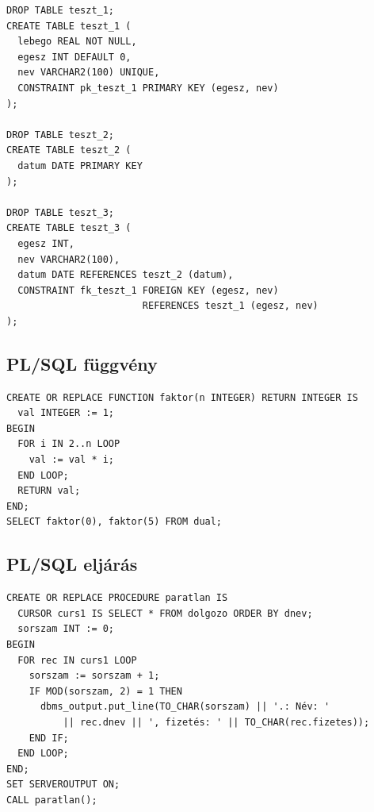 \documentclass[12pt,a4paper]{article}
\begin{document}
\begin{verbatim}
DROP TABLE teszt_1;
CREATE TABLE teszt_1 (
  lebego REAL NOT NULL,
  egesz INT DEFAULT 0,
  nev VARCHAR2(100) UNIQUE,
  CONSTRAINT pk_teszt_1 PRIMARY KEY (egesz, nev)
);

DROP TABLE teszt_2;
CREATE TABLE teszt_2 (
  datum DATE PRIMARY KEY
);

DROP TABLE teszt_3;
CREATE TABLE teszt_3 (
  egesz INT,
  nev VARCHAR2(100),
  datum DATE REFERENCES teszt_2 (datum),
  CONSTRAINT fk_teszt_1 FOREIGN KEY (egesz, nev)
                        REFERENCES teszt_1 (egesz, nev)
);
\end{verbatim}

\pagebreak

\subsection{PL/SQL függvény}

\begin{verbatim}
CREATE OR REPLACE FUNCTION faktor(n INTEGER) RETURN INTEGER IS
  val INTEGER := 1;
BEGIN
  FOR i IN 2..n LOOP
    val := val * i;
  END LOOP;
  RETURN val;
END;
SELECT faktor(0), faktor(5) FROM dual;
\end{verbatim}

\subsection{PL/SQL eljárás}

\begin{verbatim}
CREATE OR REPLACE PROCEDURE paratlan IS
  CURSOR curs1 IS SELECT * FROM dolgozo ORDER BY dnev;
  sorszam INT := 0;
BEGIN
  FOR rec IN curs1 LOOP
    sorszam := sorszam + 1;
    IF MOD(sorszam, 2) = 1 THEN
      dbms_output.put_line(TO_CHAR(sorszam) || '.: Név: '
          || rec.dnev || ', fizetés: ' || TO_CHAR(rec.fizetes));
    END IF;
  END LOOP;
END;
SET SERVEROUTPUT ON;
CALL paratlan();
\end{verbatim}
\end{document}
